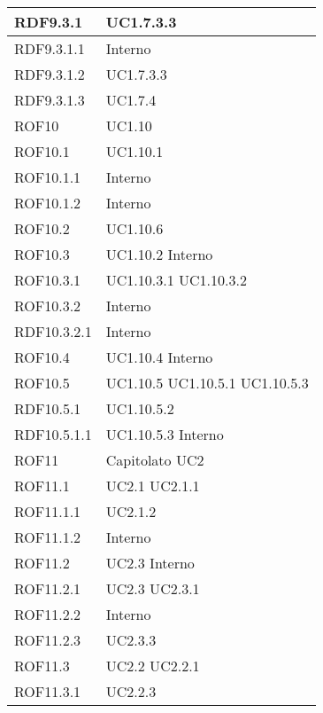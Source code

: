 \begin{center}
\begin{longtable}{| p{4cm} | p{4cm} |}
\hline
RDF9.3.1   &  UC1.7.3.3\\
\hline
RDF9.3.1.1   &  Interno \\
\hline
RDF9.3.1.2   &  UC1.7.3.3\\
\hline
RDF9.3.1.3   &  UC1.7.4\\
\hline
ROF10   &  UC1.10 \\
\hline
ROF10.1   &  UC1.10.1 \\
\hline
ROF10.1.1   &  Interno \\
\hline
ROF10.1.2   &  Interno \\
\hline
ROF10.2   &  UC1.10.6 \\
\hline
ROF10.3   &  UC1.10.2 \newline Interno \\
\hline
ROF10.3.1   &  UC1.10.3.1 \newline UC1.10.3.2 \\
\hline
ROF10.3.2   &  Interno \\
\hline
RDF10.3.2.1   &  Interno \\
\hline
ROF10.4   &  UC1.10.4 \newline Interno \\
\hline
ROF10.5   &  UC1.10.5 \newline UC1.10.5.1 \newline UC1.10.5.3 \\
\hline
RDF10.5.1   &  UC1.10.5.2 \\
\hline
RDF10.5.1.1   &  UC1.10.5.3 \newline Interno \\
\hline
ROF11   &  Capitolato \newline UC2 \\
\hline
ROF11.1   &  UC2.1 \newline UC2.1.1 \\
\hline
ROF11.1.1   &  UC2.1.2 \\
\hline
ROF11.1.2   &  Interno \\
\hline
ROF11.2   &  UC2.3 \newline Interno \\
\hline
ROF11.2.1   &  UC2.3 \newline UC2.3.1 \\
\hline
ROF11.2.2   &  Interno \\
\hline
ROF11.2.3   &  UC2.3.3 \\
\hline
ROF11.3   &  UC2.2 \newline UC2.2.1 \\
\hline
ROF11.3.1   &  UC2.2.3 \\
\hline

\end{longtable}
\end{center}
